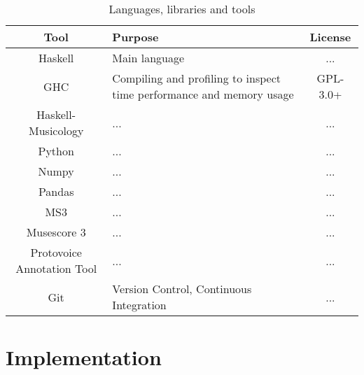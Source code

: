 \documentclass[12pt,a4paper,twoside,openright]{report}
\begin{document}
\begin{table}
  {
  \small
  \caption{Languages, libraries and tools}
  \label{Languages}
  \begin{center}
    \begin{tabularx}{.9\textwidth}{cXc}
      Tool & Purpose & License \\
      \toprule
      Haskell & Main language & ... \\
      \midrule
      GHC & Compiling and profiling to inspect time performance and memory usage  & GPL-3.0+ \\
      \midrule
      Haskell-Musicology & ... & ... \\
      \midrule
      Python & ... & ... \\
      \midrule
      Numpy & ... & ... \\
      \midrule
      Pandas & ... & ... \\
      \midrule
      MS3 & ... & ... \\
      \midrule
      Musescore 3 & ... & ... \\
      \midrule
      Protovoice Annotation Tool & ... & ... \\
      \midrule
      Git & Version Control, Continuous Integration & ... \\
      \bottomrule
    \end{tabularx}
  \end{center}
  }
\end{table}


\chapter{Implementation}
\end{document}
